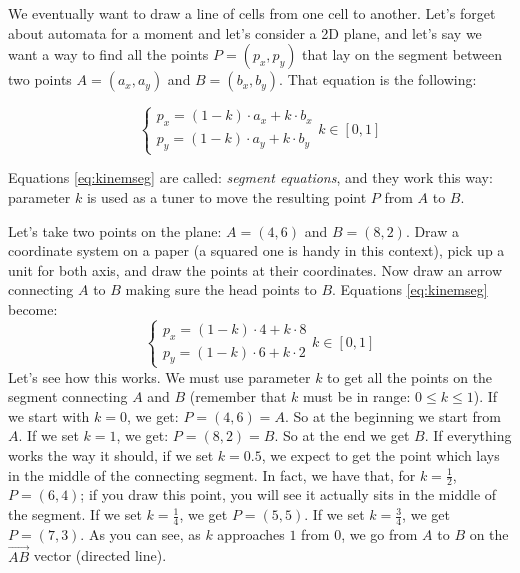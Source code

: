 We eventually want to draw a line of cells from one cell to another. Let's forget about
automata for a moment and let's consider a 2D plane, and let's say we want a way to find
all the points $P = (p_x, p_y)$ that lay on
the segment between two points $A = (a_x, a_y)$ and $B = (b_x, b_y)$.
That equation is the following:

\begin{equation}
\label{eq:kinemseg}
\begin{cases}
p_x = (1-k) \cdot a_x + k \cdot b_x\\
p_y = (1-k) \cdot a_y + k \cdot b_y
\end{cases}
k \in [0,1]
\end{equation}

Equations \ref{eq:kinemseg} are called: \textit{segment equations}, and they work 
this way: parameter $k$ is used as a tuner to move the resulting
point $P$ from $A$ to $B$.

\begin{example}
\label{ex:kinemseg}
Let's take two points on the plane: $A = (4,6)$ and $B = (8,2)$. Draw a coordinate system
on a paper (a squared one is handy in this context),
pick up a unit for both axis, and draw the points at their coordinates. Now draw an arrow
connecting $A$ to $B$ making sure the head points to $B$. Equations \ref{eq:kinemseg}
become:
\begin{equation*}
\begin{cases}
p_x = (1-k) \cdot 4 + k \cdot 8\\
p_y = (1-k) \cdot 6 + k \cdot 2
\end{cases}
k \in [0,1]
\end{equation*}
Let's see how this works. We must use parameter $k$ to get all the points on the segment
connecting $A$ and $B$ (remember that $k$ must be in range: $0 \leq k \leq 1$). If we
start with $k=0$, we get: $P = (4,6) = A$. So at the beginning we start from $A$. If we
set $k=1$, we get: $P = (8,2) = B$. So at the end we get $B$. If everything works the way
it should, if we set $k=0.5$, we expect to get the point which lays in the middle of the
connecting segment. In fact, we have that, for $k=\frac{1}{2}$, $P = (6,4)$; if you draw
this point, you will see it actually sits in the middle of the segment.
If we set $k=\frac{1}{4}$, we get $P = (5,5)$.
If we set $k=\frac{3}{4}$, we get $P = (7,3)$.
As you can see, as $k$ approaches $1$ from $0$, we go from $A$ to $B$ on
the $\overrightarrow{AB}$ vector (directed line).
\end{example}

